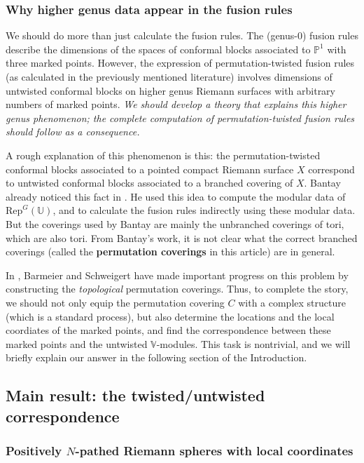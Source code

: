 \documentclass[11pt,b5paper,notitlepage]{article}
\theoremstyle{definition}
\theoremstyle{plain}
\newcommand{\Rep}{\mathrm{Rep}}
\newcommand{\Vbb}{\mathbb V}
\newcommand{\Ubb}{\mathbb U}
\newcommand{\Pbb}{\mathbb P}
\numberwithin{equation}{subsection}
\begin{document}
\subsubsection*{Why higher genus data appear in the fusion rules}


We should do more than just calculate the fusion rules. The (genus-$0$) fusion rules describe the dimensions of the spaces of conformal blocks associated to $\Pbb^1$ with three marked points. However, the expression of permutation-twisted fusion rules (as calculated in the previously mentioned literature) involves dimensions of untwisted conformal blocks on higher genus Riemann surfaces with arbitrary numbers of marked points. \textit{We should develop a theory that explains this higher genus phenomenon; the complete computation of permutation-twisted fusion rules should follow as a consequence.}

A rough explanation of this phenomenon is this: the permutation-twisted conformal blocks associated to a pointed compact Riemann surface $X$ correspond to untwisted conformal blocks associated to a branched covering of $X$. Bantay already noticed this fact in \cite{Ban98,Ban02}. He used this idea to compute the modular data of $\Rep^G(\Ubb)$, and to calculate the fusion rules indirectly using these modular data. But the coverings used by Bantay are mainly the unbranched coverings of tori, which are also tori. From Bantay's work, it is not clear what the correct branched coverings (called the \textbf{permutation coverings} in this article) are in general.


In \cite{BS11}, Barmeier and Schweigert have made important progress on this problem by constructing the \textit{topological} permutation coverings. Thus, to complete the story, we should not only equip the permutation covering $C$ with a complex structure (which is a standard process), but also determine the locations and the local coordiates of the marked points, and find the correspondence between these marked points and the untwisted $\Vbb$-modules. This task is nontrivial, and we will briefly explain our answer in the following section of the Introduction. 

\subsection{Main result: the twisted/untwisted correspondence}


\subsubsection*{Positively $N$-pathed Riemann spheres with local coordinates}
\end{document}
